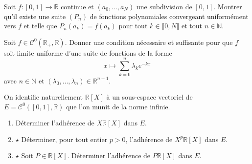 \documentclass[french,a4paper]{article}
\newcommand{\N}{\mathbb{N}}
\newcommand{\R}{\mathbb{R}}
\theoremstyle{plain}
\theoremstyle{definition}
\theoremstyle{remark}
\begin{document}
\begin{ex}{}
	Soit $f:[0,1]\to\R$ continue et $(a_0,\ldots,a_N)$ une subdivision de $[0,1]$. Montrer qu'il existe une suite $(P_n)$ de fonctions polynomiales convergeant uniformément vers $f$ et telle que $P_n(a_k)=f(a_k)$ pour tout $k\in\llbracket 0,N\rrbracket$ et tout $n\in\N$.
\end{ex}

\begin{ex}{}
	Soit $f\in\mathcal{C}^0(\R_+,\R)$. Donner une condition nécessaire et suffisante pour que $f$ soit limite uniforme d'une suite de fonctions de la forme $$x\mapsto\sum_{k=0}^{n}\lambda_ke^{-kx}$$ avec $n\in\N$ et $(\lambda_0,\ldots,\lambda_n)\in\R^{n+1}$.
\end{ex}

\begin{ex}{}
	On identifie naturellement $\R[X]$ à un sous-espace vectoriel de $E=\mathcal{C}^0([0,1],\R)$ que l'on munit de la norme infinie.
	\begin{enumerate}
		\item Déterminer l'adhérence de $X\R[X]$ dans $E$.
		\item $\star$ Déterminer, pour tout entier $p>0$, l'adhérence de $X^p\R[X]$ dans $E$.
		\item $\star$ Soit $P\in\R[X]$. Déterminer l'adhérence de $P\R[X]$ dans $E$.
	\end{enumerate}
\end{ex}
\end{document}
